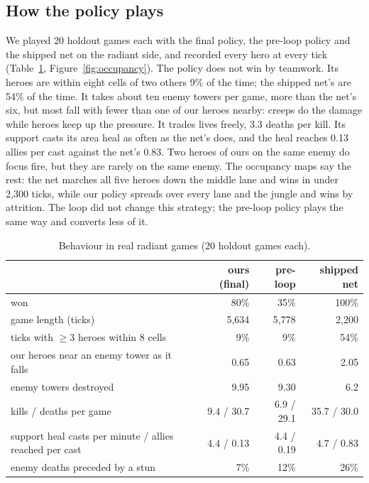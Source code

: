 \documentclass[11pt]{article}
\begin{document}
\subsection{How the policy plays}

We played 20 holdout games each with the final policy, the pre-loop policy and the shipped net on the radiant side, and recorded every hero at every tick (Table~\ref{tab:behaviour}, Figure~\ref{fig:occupancy}). The policy does not win by teamwork. Its heroes are within eight cells of two others 9\% of the time; the shipped net's are 54\% of the time. It takes about ten enemy towers per game, more than the net's six, but most fall with fewer than one of our heroes nearby: creeps do the damage while heroes keep up the pressure. It trades lives freely, 3.3 deaths per kill. Its support casts its area heal as often as the net's does, and the heal reaches 0.13 allies per cast against the net's 0.83. Two heroes of ours on the same enemy do focus fire, but they are rarely on the same enemy. The occupancy maps say the rest: the net marches all five heroes down the middle lane and wins in under 2,300 ticks, while our policy spreads over every lane and the jungle and wins by attrition. The loop did not change this strategy; the pre-loop policy plays the same way and converts less of it.

\begin{table}[!htbp]
\centering\small
\caption{Behaviour in real radiant games (20 holdout games each).}
\label{tab:behaviour}
\begin{tabular}{l r r r}
\toprule
 & ours (final) & pre-loop & shipped net \\
\midrule
won & 80\% & 35\% & 100\% \\
game length (ticks) & 5,634 & 5,778 & 2,200 \\
ticks with $\ge$3 heroes within 8 cells & 9\% & 9\% & 54\% \\
our heroes near an enemy tower as it falls & 0.65 & 0.63 & 2.05 \\
enemy towers destroyed & 9.95 & 9.30 & 6.2 \\
kills / deaths per game & 9.4 / 30.7 & 6.9 / 29.1 & 35.7 / 30.0 \\
support heal casts per minute / allies reached per cast & 4.4 / 0.13 & 4.4 / 0.19 & 4.7 / 0.83 \\
enemy deaths preceded by a stun & 7\% & 12\% & 26\% \\
\bottomrule
\end{tabular}
\end{table}
\end{document}
